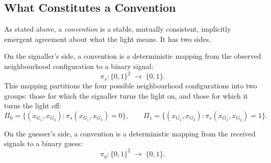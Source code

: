\documentclass[a4paper,twoside,12pt]{report}
\begin{document}
    \subsection{What Constitutes a Convention}
    
    As stated above, a \emph{convention} is a stable, mutually consistent, implicitly emergent
    agreement about what the light means. It has two sides.
    
    On the signaller's side, a convention is a deterministic mapping from the
    observed neighbourhood configuration to a binary signal:
    \begin{equation}
        \pi_s : \{0,1\}^2 \;\longrightarrow\; \{0,1\}.
    \end{equation}
    This mapping partitions the four possible neighbourhood configurations into
    two groups: those for which the signaller turns the light on, and those for
    which it turns the light off:
    \begin{equation}
        \Pi_0 = \bigl\{(x_{G_1}, x_{G_2}) : \pi_s(x_{G_1}, x_{G_2}) = 0\bigr\},
        \qquad
        \Pi_1 = \bigl\{(x_{G_1}, x_{G_2}) : \pi_s(x_{G_1}, x_{G_2}) = 1\bigr\}.
    \end{equation}
    
    On the guesser's side, a convention is a deterministic mapping from the
    received signals to a binary guess:
    \begin{equation}
        \pi_g : \{0,1\}^2 \;\longrightarrow\; \{0,1\}.
    \end{equation}
    
    
\end{document}
